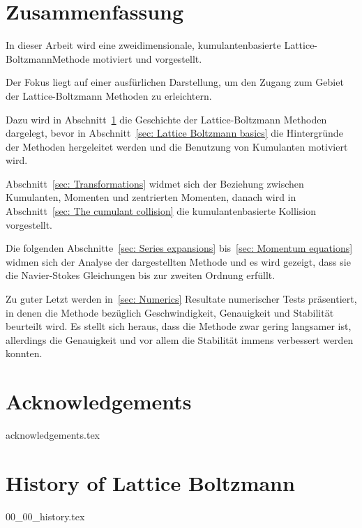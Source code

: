 \documentclass[12pt,a4paper,twoside]{article}
\begin{document}
\section*{Zusammenfassung}
In dieser Arbeit wird eine zweidimensionale, kumulantenbasierte Lattice-Boltzmann\linebreak Methode motiviert und vorgestellt.

Der Fokus liegt auf einer ausf\"urlichen Darstellung, um den Zugang zum Gebiet der Lattice-Boltzmann Methoden zu erleichtern.

Dazu wird in Abschnitt~\ref{sec: History of Lattice Boltzmann} die Geschichte der Lattice-Boltzmann Methoden dargelegt, bevor in Abschnitt~\ref{sec: Lattice Boltzmann basics} die Hintergr\"unde der Methoden hergeleitet werden und die Benutzung von Kumulanten motiviert wird.

Abschnitt~\ref{sec: Transformations} widmet sich der Beziehung zwischen Kumulanten, Momenten und zentrierten Momenten, danach wird in Abschnitt~\ref{sec: The cumulant collision} die kumulantenbasierte Kollision vorgestellt.

Die folgenden Abschnitte~\ref{sec: Series expansions} bis~\ref{sec: Momentum equations} widmen sich der Analyse der dargestellten Methode und es wird gezeigt, dass sie die Navier-Stokes Gleichungen bis zur zweiten Ordnung erfüllt.

Zu guter Letzt werden in~\ref{sec: Numerics} Resultate numerischer Tests pr\"asentiert, in denen die Methode bez\"uglich Geschwindigkeit, Genauigkeit und Stabilit\"at beurteilt wird.
Es stellt sich heraus, dass die Methode zwar gering langsamer ist, allerdings die Genauigkeit und vor allem die Stabilität immens verbessert werden konnten.

\newpage
\tableofcontents
\newpage

\section*{Acknowledgements}
{acknowledgements.tex}
\newpage

\printglossaries{}
\newpage

\pagestyle{headings}
\section{History of Lattice Boltzmann}
\label{sec: History of Lattice Boltzmann}
{00_00_history.tex}
\end{document}
